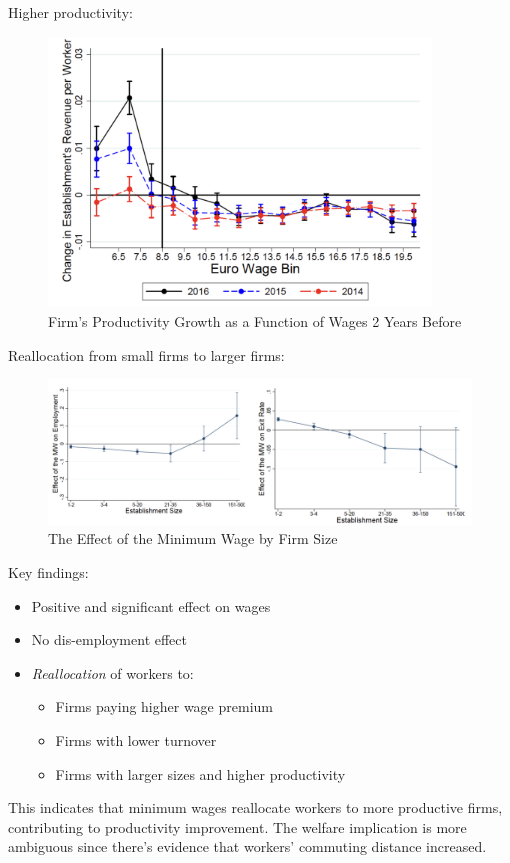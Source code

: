             Higher productivity:
            \begin{figure}[H]
                \centering
                \includegraphics[width=4in]{images/ch2/reallocation_4.png}
                \caption{Firm’s Productivity Growth as a Function of Wages 2 Years Before}
            \end{figure}
            Reallocation from small firms to larger firms:
            \begin{figure}[H]
                \centering
                \includegraphics[width=5.5in]{images/ch2/reallocation_5.png}
                \caption{The Effect of the Minimum Wage by Firm Size}
            \end{figure}
            Key findings:
            \begin{itemize}
                \item Positive and significant effect on wages
                \item No dis-employment effect
                \item \emph{Reallocation} of workers to:
                \begin{itemize}
                    \item Firms paying higher wage premium
                    \item Firms with lower turnover
                    \item Firms with larger sizes and higher productivity
                \end{itemize}
            \end{itemize}
            This indicates that minimum wages reallocate workers to more productive firms, contributing to productivity improvement. The welfare implication is more ambiguous since there's evidence that workers' commuting distance increased.
            
